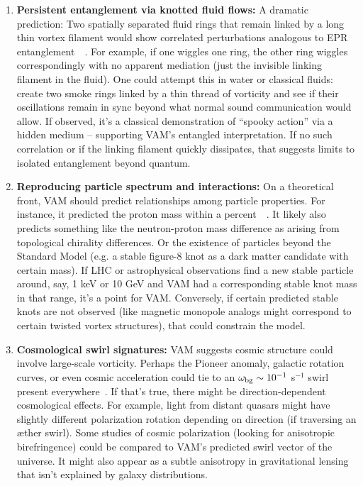 \documentclass[a4paper,12pt]{article}
\begin{document}
\begin{enumerate}
        \item \textbf{Persistent entanglement via knotted fluid flows:}
        A dramatic prediction: Two spatially separated fluid rings that remain linked by a long thin vortex filament would show correlated perturbations analogous to EPR entanglement~\cite{reference_249}~\cite{reference_250}. For example, if one wiggles one ring, the other ring wiggles correspondingly with no apparent mediation (just the invisible linking filament in the fluid). One could attempt this in water or classical fluids: create two smoke rings linked by a thin thread of vorticity and see if their oscillations remain in sync beyond what normal sound communication would allow. If observed, it’s a classical demonstration of “spooky action” via a hidden medium – supporting VAM’s entangled interpretation. If no such correlation or if the linking filament quickly dissipates, that suggests limits to isolated entanglement beyond quantum.

        \item \textbf{Reproducing particle spectrum and interactions:}
        On a theoretical front, VAM should predict relationships among particle properties. For instance, it predicted the proton mass within a percent~\cite{reference_251}~\cite{reference_252}. It likely also predicts something like the neutron-proton mass difference as arising from topological chirality differences. Or the existence of particles beyond the Standard Model (e.g. a stable figure-8 knot as a dark matter candidate with certain mass). If LHC or astrophysical observations find a new stable particle around, say, 1 keV or 10 GeV and VAM had a corresponding stable knot mass in that range, it’s a point for VAM. Conversely, if certain predicted stable knots are not observed (like magnetic monopole analogs might correspond to certain twisted vortex structures), that could constrain the model.

        \item \textbf{Cosmological swirl signatures:}
        VAM suggests cosmic structure could involve large-scale vorticity. Perhaps the Pioneer anomaly, galactic rotation curves, or even cosmic acceleration could tie to an $\omega_{\rm bg} \sim 10^{-1}$ s$^{-1}$ swirl present everywhere~\cite{reference_253}. If that’s true, there might be direction-dependent cosmological effects. For example, light from distant quasars might have slightly different polarization rotation depending on direction (if traversing an æther swirl). Some studies of cosmic polarization (looking for anisotropic birefringence) could be compared to VAM’s predicted swirl vector of the universe. It might also appear as a subtle anisotropy in gravitational lensing that isn’t explained by galaxy distributions.


\end{enumerate}
\end{document}
